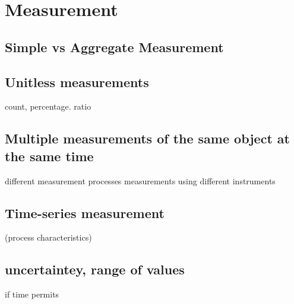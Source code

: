 \chapter{Measurement}

\section{Simple vs Aggregate Measurement}

\section{Unitless measurements}
count, percentage. ratio

\section{Multiple measurements of the same object at the same time}
different measurement processes 
measurements using different instruments

\section{Time-series measurement}
(process characteristics)

\section{uncertaintey, range of values}
if time permits

